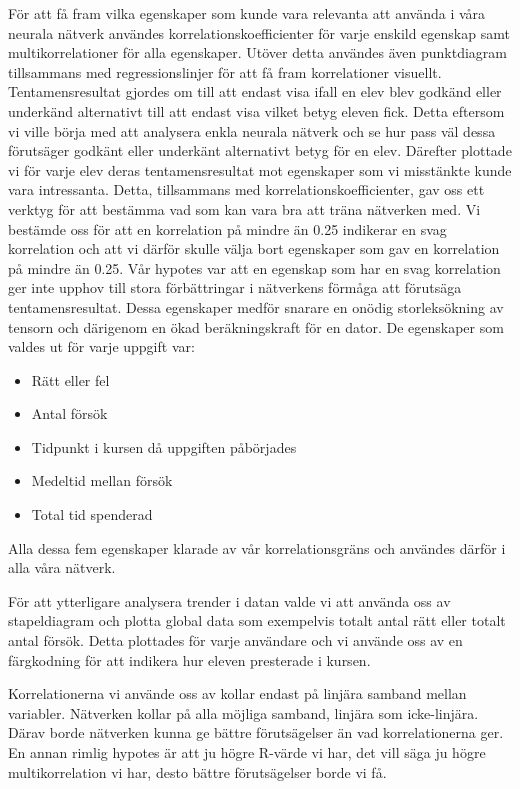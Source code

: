 För att få fram vilka egenskaper som kunde vara relevanta att använda i våra neurala nätverk användes korrelationskoefficienter för varje enskild egenskap samt multikorrelationer för alla egenskaper. Utöver detta användes även punktdiagram tillsammans med regressionslinjer för att få fram korrelationer visuellt. Tentamensresultat gjordes om till att endast visa ifall en elev blev godkänd eller underkänd alternativt till att endast visa vilket betyg eleven fick. Detta eftersom vi ville börja med att analysera enkla neurala nätverk och se hur pass väl dessa förutsäger godkänt eller underkänt alternativt betyg för en elev. Därefter plottade vi för varje elev deras tentamensresultat mot egenskaper som vi misstänkte kunde vara intressanta. Detta, tillsammans med korrelationskoefficienter, gav oss ett verktyg för att bestämma vad som kan vara bra att träna nätverken med. Vi bestämde oss för att en korrelation på mindre än 0.25 indikerar en svag korrelation och att vi därför skulle välja bort egenskaper som gav en korrelation på mindre än 0.25. Vår hypotes var att en egenskap som har en svag korrelation ger inte upphov till stora förbättringar i nätverkens förmåga att förutsäga tentamensresultat. Dessa egenskaper medför snarare en onödig storleksökning av tensorn och därigenom en ökad beräkningskraft för en dator. De egenskaper som valdes ut för varje uppgift var:

\begin{itemize}
    \item Rätt eller fel
    \item Antal försök 
    \item Tidpunkt i kursen då uppgiften påbörjades 
    \item Medeltid mellan försök 
    \item Total tid spenderad
\end{itemize}

Alla dessa fem egenskaper klarade av vår korrelationsgräns och användes därför i alla våra nätverk. 

För att ytterligare analysera trender i datan valde vi att använda oss av stapeldiagram och plotta global data som exempelvis totalt antal rätt eller totalt antal försök. Detta plottades för varje användare och vi använde oss av en färgkodning för att indikera hur eleven presterade i kursen.

Korrelationerna vi använde oss av kollar endast på linjära samband mellan variabler. Nätverken kollar på alla möjliga samband, linjära som icke-linjära. Därav borde nätverken kunna ge bättre förutsägelser än vad korrelationerna ger. En annan rimlig hypotes är att ju högre R-värde vi har, det vill säga ju högre multikorrelation vi har, desto bättre förutsägelser borde vi få. 


